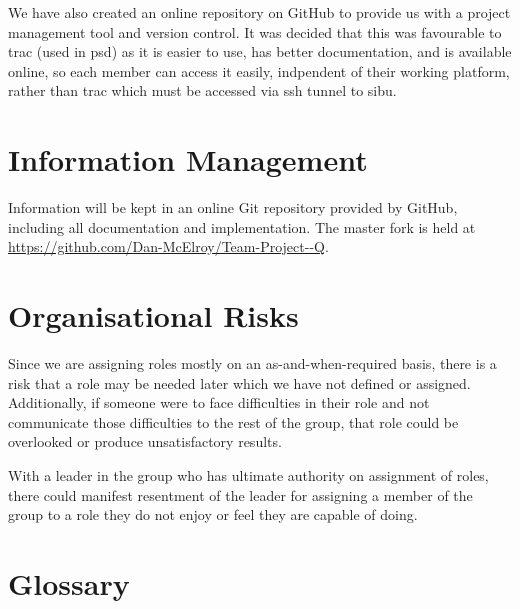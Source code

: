 \documentclass{l3deliverable}
\begin{document}
We have also created an online repository on GitHub to provide us with
a project management tool and version control.
It was decided that this was favourable to trac (used in \gls{psd}) as it is easier
to use, has better documentation, and is available online, so each member can
access it easily, indpendent of their working platform, rather than
trac which must be accessed via ssh tunnel to sibu.


\section{Information Management}

Information will be kept in an online Git repository provided by GitHub,
including all documentation and implementation. The master fork is
held at \url{https://github.com/Dan-McElroy/Team-Project--Q}.


\section{Organisational Risks}

Since we are assigning roles mostly on an as-and-when-required basis, there is
a risk that a role may be needed later which we have not defined or assigned.
Additionally, if someone were to face difficulties in their role and not 
communicate those difficulties to the rest of the group, that role could be 
overlooked or produce unsatisfactory results.

With a leader in the group who has ultimate authority on assignment of roles,
there could manifest resentment of the leader for assigning a member of the 
group to a role they do not enjoy or feel they are capable of doing.


\appendix

\section{Glossary}



\end{document}
